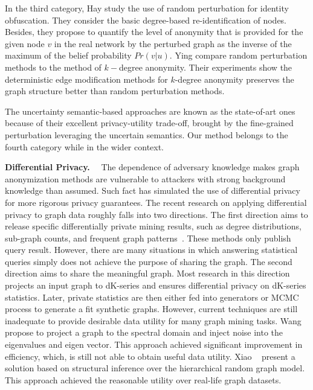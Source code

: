 In the third category, Hay {\etal} \cite{Liu_Privacy_2009} study the use of random perturbation for identity obfuscation. They consider the basic degree-based re-identification of nodes. Besides, they propose to quantify the level of anonymity that is provided for the given node $v$ in the real network by the perturbed graph as the inverse of the maximum of the belief probability $Pr(v|u)$. Ying {\etal} \cite{Ying_Randomizing_2008} compare random perturbation methods to the method of $k-$degree anonymity. Their experiments show the deterministic edge modification methods for $k$-degree anonymity preserves the graph structure better than random perturbation methods.

The uncertainty semantic-based approaches are known as the state-of-art ones because of their excellent privacy-utility trade-off, brought by the fine-grained perturbation leveraging the uncertain semantics. 
Our method belongs to the fourth category while in the wider context. 

 
\textbf{Differential Privacy.}~~
The dependence of adversary knowledge makes graph anonymization methods are vulnerable to attackers with strong background knowledge than assumed. Such fact has simulated the use of differential privacy for more rigorous privacy guarantees. 
The recent research on applying differential privacy to graph data roughly falls into two directions. The first direction aims to release specific differentially private mining results, such as degree distributions, sub-graph counts, and frequent graph patterns~\cite{Xiao_Differentially_2014, Day:2016}. These methods only publish query result. However, there are many situations in which answering statistical queries simply does not achieve the purpose of sharing the graph.  
The second direction aims to share the meaningful graph. Most research in this direction~\cite{Sala_Sharing_2011,Proserpio_2012} projects an input graph to dK-series and ensures differential privacy on dK-series statistics. Later, private statistics are then either fed into generators or MCMC process to generate a fit synthetic graphs. However, current techniques are still inadequate to provide desirable data utility for many graph mining tasks. Wang {\etal}~\cite{Wang_2013} propose to project a graph to the spectral domain and inject noise into the eigenvalues and eigen vector. This approach achieved significant improvement in efficiency, which, is still not able to obtain useful data utility. Xiao {\etal}~\cite{Xiao_Differentially_2014} present a solution based on structural inference over the hierarchical random graph model. This approach achieved the reasonable utility over real-life graph datasets. 

